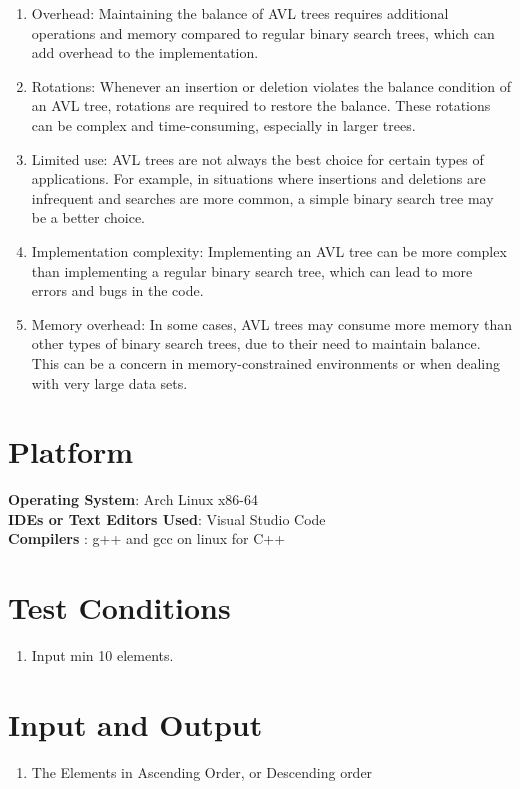\documentclass[11pt]{article}
\begin{document}
\begin{enumerate}
    \item Overhead: Maintaining the balance of AVL trees requires additional operations and memory compared to regular binary search trees, which can add overhead to the implementation.

    \item Rotations: Whenever an insertion or deletion violates the balance condition of an AVL tree, rotations are required to restore the balance. These rotations can be complex and time-consuming, especially in larger trees.

    \item Limited use: AVL trees are not always the best choice for certain types of applications. For example, in situations where insertions and deletions are infrequent and searches are more common, a simple binary search tree may be a better choice.

    \item Implementation complexity: Implementing an AVL tree can be more complex than implementing a regular binary search tree, which can lead to more errors and bugs in the code.

    \item Memory overhead: In some cases, AVL trees may consume more memory than other types of binary search trees, due to their need to maintain balance. This can be a concern in memory-constrained environments or when dealing with very large data sets.
\end{enumerate}


\section{Platform}
\textbf{\textbf{Operating System}}: Arch Linux x86-64 \\
\textbf{\textbf{IDEs or Text Editors Used}}: Visual Studio Code\\
\textbf{\textbf{Compilers} }: g++ and gcc on linux for C++\\

\section{Test Conditions}
\begin{enumerate}
    \item Input min 10 elements.
\end{enumerate}

\section{Input and Output}
\begin{enumerate}
    \item The Elements in Ascending Order, or Descending order
\end{enumerate}
\end{document}
